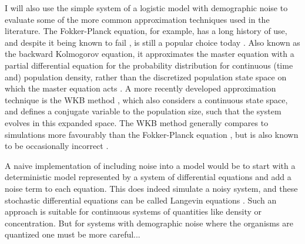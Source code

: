 I will also use the simple system of a logistic model with demographic noise to evaluate some of the more common approximation techniques used in the literature. 
The Fokker-Planck equation, for example, has a long history of use, and despite it being known to fail \cite{Grasman1983,Doering2005}, is still a popular choice today \cite{Kimura1955,Mangel1977,Roozen1987,Leigh1981,Lande1993,Foley1994,Traulsen2006,Parsons2007,Parsons2010,Chotibut2015,Constable2015,Lin2015,Iyer-Biswas2015,Yu2017,Young2018}. 
Also known as the backward Kolmogorov equation, it approximates the master equation with a partial differential equation for the probability distribution for continuous (time and) population density, rather than the discretized population state space on which the master equation acts \cite{Nisbet1982,Gardiner2004a}. 
A more recently developed approximation technique is the WKB method \cite{Doering2005,Assaf2006,Kessler2007,Ovaskainen2010,Assaf2016}, which also considers a continuous state space, and defines a conjugate variable to the population size, such that the system evolves in this expanded space. 
The WKB method generally compares to simulations more favourably than the Fokker-Planck equation \cite{Yu2017}, but is also known to be occasionally incorrect \cite{Assaf2010}. %

\iffalse
A naive implementation of including noise into a model would be to start with a deterministic model represented by a system of differential equations and add a noise term to each equation. 
This does indeed simulate a noisy system, and these stochastic differential equations can be called Langevin equations \cite{Nisbet1982,Gardiner2004a}. 
Such an approach is suitable for continuous systems of quantities like density or concentration. 
But for systems with demographic noise where the organisms are quantized one must be more careful...

